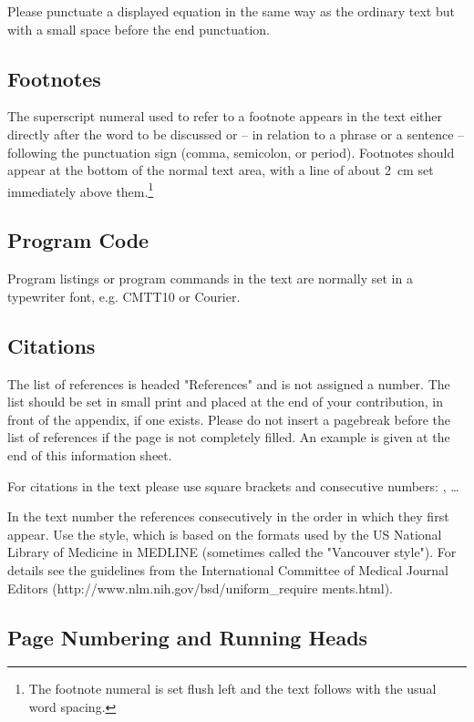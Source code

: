 \documentclass[a4paper,10pt,twocolumn,twoside,openright]{article}
\begin{document}
Please punctuate a displayed equation in the same way as the ordinary text but with a small space before the end punctuation.

\subsection{Footnotes}

The superscript numeral used to refer to a footnote appears in the text either directly after the word to be discussed or -- in relation to a phrase or a sentence -- following the punctuation sign (comma, semicolon, or period). Footnotes should appear at the bottom of the normal text area, with a line of about 2~cm set immediately above them.\footnote{The footnote numeral is set flush left and the text follows with the usual word spacing.}

\subsection{Program Code}

Program listings or program commands in the text are normally set in a typewriter font, e.g. CMTT10 or Courier.


\subsection{Citations}

The list of references is headed "References" and is not assigned a number. The list should be set in small print and placed at the end of your contribution, in front of the appendix, if one exists. Please do not insert a pagebreak before the list of references if the page is not completely filled. An example is given at the end of this information sheet. 

For citations in the text please use square brackets and consecutive numbers: \cite{Blobel}, \cite{Kalina, Bemmel, Zvarova}\dots 

In the text number the references consecutively in the order in which they first appear. Use the style, which is based on the formats used by the US National Library of Medicine in MEDLINE (sometimes called the "Vancouver style"). For details see the guidelines from the International Committee of Medical Journal Editors (http://www.nlm.nih.gov/bsd/uniform\_require ments.html).


\subsection{Page Numbering and Running Heads}
\end{document}
